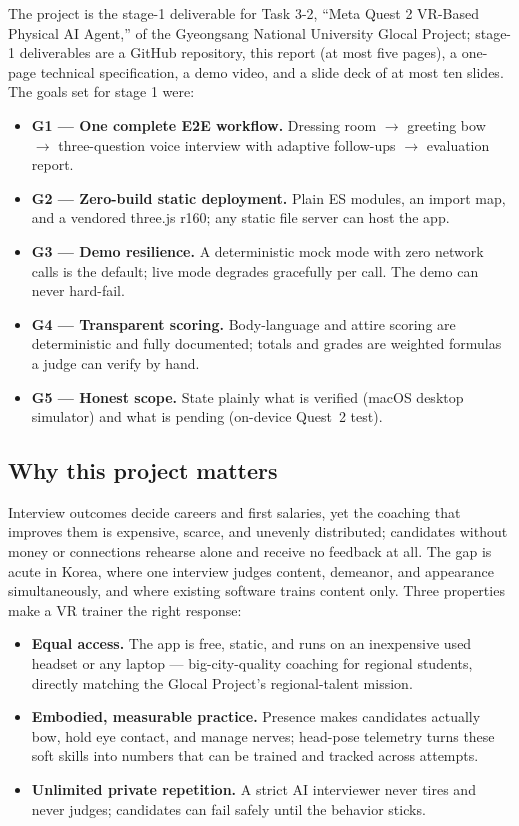 \documentclass[10pt,a4paper]{article}
\begin{document}
The project is the stage-1 deliverable for Task 3-2, ``Meta Quest 2 VR-Based Physical AI Agent,'' of the Gyeongsang National University Glocal Project; stage-1 deliverables are a GitHub repository, this report (at most five pages), a one-page technical specification, a demo video, and a slide deck of at most ten slides. The goals set for stage 1 were:
\begin{itemize}[leftmargin=1.6em,itemsep=1pt]
  \item \textbf{G1 --- One complete E2E workflow.} Dressing room $\rightarrow$ greeting bow $\rightarrow$ three-question voice interview with adaptive follow-ups $\rightarrow$ evaluation report.
  \item \textbf{G2 --- Zero-build static deployment.} Plain ES modules, an import map, and a vendored three.js r160; any static file server can host the app.
  \item \textbf{G3 --- Demo resilience.} A deterministic mock mode with zero network calls is the default; live mode degrades gracefully per call. The demo can never hard-fail.
  \item \textbf{G4 --- Transparent scoring.} Body-language and attire scoring are deterministic and fully documented; totals and grades are weighted formulas a judge can verify by hand.
  \item \textbf{G5 --- Honest scope.} State plainly what is verified (macOS desktop simulator) and what is pending (on-device Quest~2 test).
\end{itemize}

\subsection{Why this project matters}
Interview outcomes decide careers and first salaries, yet the coaching that improves them is expensive, scarce, and unevenly distributed; candidates without money or connections rehearse alone and receive no feedback at all. The gap is acute in Korea, where one interview judges content, demeanor, and appearance simultaneously, and where existing software trains content only. Three properties make a VR trainer the right response:
\begin{itemize}[leftmargin=1.6em,itemsep=1pt]
  \item \textbf{Equal access.} The app is free, static, and runs on an inexpensive used headset or any laptop --- big-city-quality coaching for regional students, directly matching the Glocal Project's regional-talent mission.
  \item \textbf{Embodied, measurable practice.} Presence makes candidates actually bow, hold eye contact, and manage nerves; head-pose telemetry turns these soft skills into numbers that can be trained and tracked across attempts.
  \item \textbf{Unlimited private repetition.} A strict AI interviewer never tires and never judges; candidates can fail safely until the behavior sticks.
\end{itemize}
\end{document}
